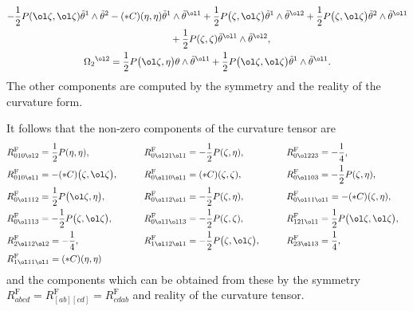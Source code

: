 \begin{Proposition}
\begin{gather*}
 -\frac{1}{2}P(\ol\zeta ,\ol\zeta)\tilde\theta^1\wedge\tilde\theta^2
-(*C)(\eta, \eta)\tilde\theta^1\wedge\tilde\theta^{\ol1}
+\frac{1}{2}
P\bigl(\zeta, \ol\zeta\bigr)\tilde\theta^1\wedge\tilde\theta^{\ol2}
+\frac{1}{2}P\bigl(\zeta, \ol\zeta\bigr)\tilde\theta^2\wedge\tilde\theta^{\ol1} \\
\hphantom{\Omega_1{}^2=}{}\hspace{0.2mm}
+\frac{1}{2}P(\zeta, \zeta)\tilde\theta^{\ol1}\wedge\tilde\theta^{\ol2}, \\
\Omega_2{}^{\ol2}=\frac{1}{2}P\bigl(\ol\zeta, \eta\bigr)\theta\wedge\tilde\theta^{\ol1}+\frac{1}{2}P\bigl(\ol\zeta, \ol\zeta\bigr)\tilde\theta^1\wedge\tilde\theta^{\ol1}.
\end{gather*}
The other components are computed by the symmetry and the reality of the curvature form.
\end{Proposition}
It follows that the non-zero components of the curvature tensor are
\begin{alignat*}{4}
&R^{\mathrm{F}}_{010\ol2}=\frac{1}{2}P(\eta, \eta),
\qquad&&
R^{\mathrm{F}}_{0\ol21\ol1}=-\frac{1}{2}P(\zeta, \eta),
\qquad&&
R^{\mathrm{F}}_{0\ol223}=-\frac{1}{4},& \\
&R^{\mathrm{F}}_{010\ol1}=-(*C)\bigl(\zeta, \ol\zeta\bigr),
\qquad&&
R^{\mathrm{F}}_{0\ol10\ol1}=(*C)(\zeta, \zeta),
\qquad&&
R^{\mathrm{F}}_{0\ol103}=-\frac{1}{2}P(\zeta, \eta),& \\
&R^{\mathrm{F}}_{0\ol112}=\frac{1}{2}P\bigl(\ol\zeta, \eta\bigr),
\qquad&&
R^{\mathrm{F}}_{0\ol12\ol1}=-\frac{1}{2}P(\zeta, \eta),
\qquad&&
R^{\mathrm{F}}_{0\ol11\ol1}=-(*C)(\zeta, \eta),& \\
&R^{\mathrm{F}}_{0\ol113}=-\frac{1}{2}P\bigl(\zeta, \ol\zeta\bigr),
\qquad&&
R^{\mathrm{F}}_{0\ol1\ol13}=-\frac{1}{2}P(\zeta, \zeta),
\qquad&&
R^{\mathrm{F}}_{121\ol1}=\frac{1}{2}P\bigl(\ol\zeta, \ol\zeta\bigr),& \\
&R^{\mathrm{F}}_{2\ol12\ol2}=-\frac{1}{4},
\qquad&&
R^{\mathrm{F}}_{1\ol12\ol1}=-\frac{1}{2}P\bigl(\zeta, \ol\zeta\bigr),
\qquad&&
R^{\mathrm{F}}_{23\ol13}=\frac{1}{4},& \\
&R^{\mathrm{F}}_{1\ol11\ol1}=(*C)(\eta, \eta)&
\end{alignat*}
and the components which can be obtained from these by the symmetry
$R^{\mathrm{F}}_{abcd}=R^{\mathrm{F}}_{[ab][cd]}=R^{\mathrm{F}}_{cdab}$ and reality of the curvature tensor.

